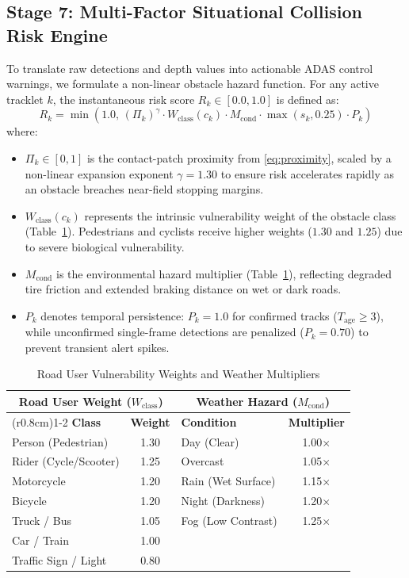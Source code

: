 \documentclass[conference]{IEEEtran}
\begin{document}
\subsection{Stage 7: Multi-Factor Situational Collision Risk Engine}
To translate raw detections and depth values into actionable ADAS control warnings, we formulate a non-linear obstacle hazard function. For any active tracklet $k$, the instantaneous risk score $R_k \in [0.0, 1.0]$ is defined as:
\begin{equation}
R_k = \min \left( 1.0, \, (\Pi_k)^{\gamma} \cdot W_{\text{class}}(c_k) \cdot M_{\text{cond}} \cdot \max(s_k, 0.25) \cdot P_k \right)
\label{eq:risk_formula}
\end{equation}
where:
\begin{itemize}
    \item $\Pi_k \in [0, 1]$ is the contact-patch proximity from \eqref{eq:proximity}, scaled by a non-linear expansion exponent $\gamma = 1.30$ to ensure risk accelerates rapidly as an obstacle breaches near-field stopping margins.
    \item $W_{\text{class}}(c_k)$ represents the intrinsic vulnerability weight of the obstacle class (Table~\ref{tab:risk_weights}). Pedestrians and cyclists receive higher weights ($1.30$ and $1.25$) due to severe biological vulnerability.
    \item $M_{\text{cond}}$ is the environmental hazard multiplier (Table~\ref{tab:risk_weights}), reflecting degraded tire friction and extended braking distance on wet or dark roads.
    \item $P_k$ denotes temporal persistence: $P_k = 1.0$ for confirmed tracks ($T_{\text{age}} \ge 3$), while unconfirmed single-frame detections are penalized ($P_k = 0.70$) to prevent transient alert spikes.
\end{itemize}

\begin{table}[htbp]
\caption{Road User Vulnerability Weights and Weather Multipliers}
\label{tab:risk_weights}
\centering
\small
\begin{tabular}{lc@{\hspace{0.8cm}}lc}
\toprule
\multicolumn{2}{c}{\textbf{Road User Weight ($W_{\text{class}}$)}} & \multicolumn{2}{c}{\textbf{Weather Hazard ($M_{\text{cond}}$)}} \\
\cmidrule(r{0.8cm}){1-2} \cmidrule{3-4}
\textbf{Class} & \textbf{Weight} & \textbf{Condition} & \textbf{Multiplier} \\
\midrule
Person (Pedestrian) & 1.30 & Day (Clear) & 1.00$\times$ \\
Rider (Cycle/Scooter) & 1.25 & Overcast & 1.05$\times$ \\
Motorcycle & 1.20 & Rain (Wet Surface) & 1.15$\times$ \\
Bicycle & 1.20 & Night (Darkness) & 1.20$\times$ \\
Truck / Bus & 1.05 & Fog (Low Contrast) & 1.25$\times$ \\
Car / Train & 1.00 & & \\
Traffic Sign / Light & 0.80 & & \\
\bottomrule
\end{tabular}
\end{table}
\end{document}
